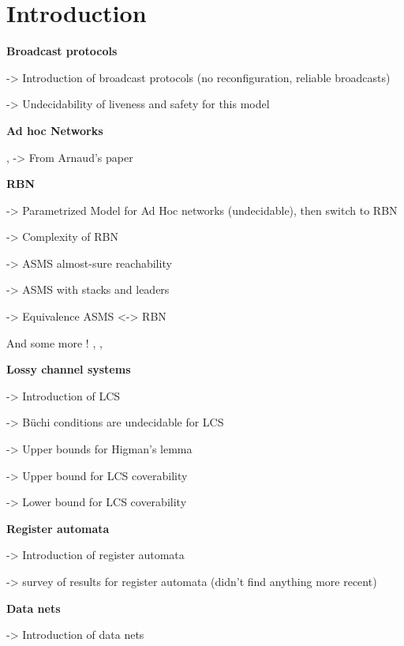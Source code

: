 \section{Introduction}

	\textbf{Broadcast protocols}

	\cite{emerson1998model} -> Introduction of broadcast protocols (no reconfiguration, reliable broadcasts)
	
	\cite{EsparzaFM1999verification} -> Undecidability of liveness and safety for this model

	\textbf{Ad hoc Networks}

	\cite{Godskesen2007calculus}, \cite{Merro2007observational} -> From Arnaud's paper

	\textbf{RBN}
	
	\cite{DelzannoSZ2010Adhoc} -> Parametrized Model for Ad Hoc networks (undecidable), then switch to RBN
	
	\cite{Delzanno2012complexity} -> Complexity of RBN
	
	\cite{BouyerMRSS2016} -> ASMS almost-sure reachability
	
	\cite{fortin2017model} -> ASMS with stacks and leaders
	
	\cite{BalaW2021} -> Equivalence ASMS <-> RBN
	
	And some more ! \cite{BalasubramanianBM2018parameterized}, \cite{BalasubramanianGW2022parameterized}, 	\cite{ChiniMS2019liveness} 
	
	\textbf{Lossy channel systems}
	
	\cite{AbdullaJ1996verif} -> Introduction of LCS
	
	\cite{AbdullaJ1996undec} -> Büchi conditions are undecidable for LCS 
	
	\cite{SchmitzS2011upperHigman} -> Upper bounds for Higman's lemma
	
	\cite{ChambartS2008ordinal} -> Upper bound for LCS coverability 
	
	\cite{Schnoebelen2002verifying} -> Lower bound for LCS coverability 
	

	\textbf{Register automata}
	
	\cite{kaminski1994finite} -> Introduction of register automata
	
	\cite{segoufin2006automata} -> survey of results for register automata (didn't find anything more recent)
	
	\textbf{Data nets}
	
	\cite{lazic2007nets} -> Introduction of data nets
	
